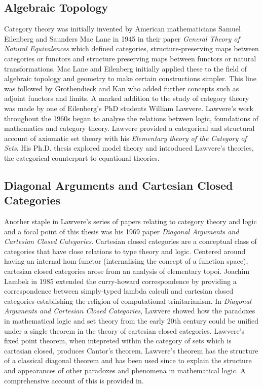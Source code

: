 \subsection{Algebraic Topology}
Category theory was initially invented by American mathematicians Samuel
Eilenberg and Saunders Mac Lane in 1945 in their paper \textit{General Theory of
Natural Equivalences} which defined categories, structure-preserving maps
between categories or functors and structure preserving maps between functors or
natural transformations. Mac Lane and Eilenberg initially applied these to the
field of algebraic topology and geometry to make certain constructions simpler.
This line was followed by Grothendieck and Kan who added further concepts such
as adjoint functors and limits. A marked addition to the study of category
theory was made by one of Eilenberg's PhD students William Lawvere. Lawvere's
work throughout the 1960s began to analyse the relations between logic,
foundations of mathematics and category theory. Lawvere provided a categorical
and structural account of axiomatic set theory with his \textit{Elementary theory of the
Category of Sets}. His Ph.D. thesis explored model theory and introduced
Lawvere's theories, the categorical counterpart to equational theories.

\subsection{Diagonal Arguments and Cartesian Closed Categories}
Another staple in Lawvere's series of papers relating to category theory and
logic and a focal point of this thesis was his 1969 paper \textit{Diagonal
Arguments and Cartesian Closed Categories}. Cartesian closed categories are
a conceptual class of categories that have close relations to type theory and
logic. Centered around having an internal hom functor (internalising the concept
of a function space), cartesian closed categories arose from an analysis of
elementary topoi. Joachim Lambek in 1985 extended the curry-howard
correspondence by providing a correspondence between simply-typed lambda calculi
and cartesian closed categories establishing the religion of computational
trinitarianism. In \textit{Diagonal Arguments and Cartesian Closed Categories},
Lawvere showed how the paradoxes in mathematical logic and set theory from the
early 20th century could be unified under a single theorem in the theory of
cartesian closed categories. Lawvere's fixed point theorem, when intepreted
within the category of sets which is cartesian closed, produces Cantor's
theorem. Lawvere's theorem has the structure of a classical diagonal theorem and
has been used since to explain the structure and appearances of other paradoxes
and phenomena in mathematical logic. A comprehensive account of this is provided
in.

